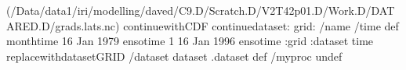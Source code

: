 \begin{ingrid}
(/Data/data1/iri/modelling/daved/C9.D/Scratch.D/V2T42p01.D/Work.D/DATARED.D/grads.lats.nc) continuewithCDF
continuedataset: 
grid:
/name /time def
monthtime
16 Jan 1979 ensotime
1
16 Jan 1996 ensotime
:grid
:dataset
time replacewithdatasetGRID
/dataset dataset .dataset def
/myproc undef
\end{ingrid}
